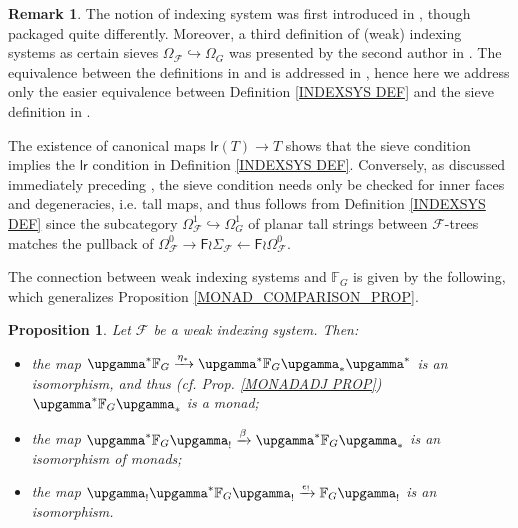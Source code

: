 \documentclass[a4paper,10pt
,draft
]{article}%
\numberwithin{equation}{section}
\numberwithin{figure}{section}
\newtheorem{proposition}[equation]{Proposition}%
\theoremstyle{definition} %
\newtheorem{remark}[equation]{Remark}%
\newcommand{\Fin}{\mathsf{F}}%
\newcommand{\F}{\ensuremath{\mathcal F}}
\newcommand{\1}{\ensuremath{\mathbbm 1}}%
\begin{document}
\begin{remark}
The notion of indexing system
was first introduced in \cite[Def. 3.22]{BH15}, though packaged quite differently.
Moreover, a third definition of (weak) indexing systems as certain sieves 
$\Omega_{\mathcal{F}} \hookrightarrow \Omega_G$
was presented by the second author in \cite[\S 9]{Pe17}. The equivalence between the definitions in \cite{BH15} and \cite{Pe17} is addressed in 
\cite[Rmk. 9.7]{Pe17}, hence here we address only the easier equivalence between Definition \ref{INDEXSYS DEF} and the sieve definition in \cite[\S 9]{Pe17}.

The existence of canonical maps 
$\mathsf{lr}(T) \to T$ shows that the sieve condition
implies the $\mathsf{lr}$ condition
in Definition \ref{INDEXSYS DEF}. 
Conversely, as discussed immediately preceding \cite[Def. 9.5]{Pe17}, the sieve condition needs only be checked for inner faces and degeneracies, i.e. tall maps, and thus follows from Definition \ref{INDEXSYS DEF} since the subcategory 
$\Omega_{\mathcal{F}}^1 \hookrightarrow \Omega^1_G$ 
of planar tall strings between $\mathcal{F}$-trees
matches the pullback of
$\Omega_{\mathcal{F}}^0 \to
\Fin \wr \Sigma_{\mathcal{F}} \leftarrow 
\Fin \wr \Omega_{\mathcal{F}}^0
$.
\end{remark}


The connection between weak indexing systems and $\mathbb{F}_G$ is given by the following,
which generalizes 
Proposition \ref{MONAD_COMPARISON_PROP}.


\begin{proposition}\label{F_MONAD_COMPARISON_PROP}
	Let $\F$ be a weak indexing system. Then:
	\begin{itemize}
	\item[(i)] the map 
		$\upgamma^{\**} \mathbb{F}_G
		\xrightarrow{\eta_{\**}}
		\upgamma^{\**} \mathbb{F}_G \upgamma_{\**} \upgamma^{\**}$
		is an isomorphism,
		and thus (cf. Prop. \ref{MONADADJ PROP})
		$\upgamma^{\**} \mathbb{F}_G \upgamma_{\**}$
		is a monad;
	\item[(ii)] the map
		$\upgamma^{\**} \mathbb{F}_G \upgamma_{!}
		\xrightarrow{\beta}
		\upgamma^{\**} \mathbb{F}_G \upgamma_{\**}$ is an isomorphism of monads;
	\item[(iii)] the map
		$\upgamma_{!}\upgamma^{\**} \mathbb{F}_G \upgamma_{!}
		\xrightarrow{\epsilon_!}
		\mathbb{F}_G \upgamma_{!}$ is an isomorphism.
	\end{itemize}
\end{proposition}
\end{document}
